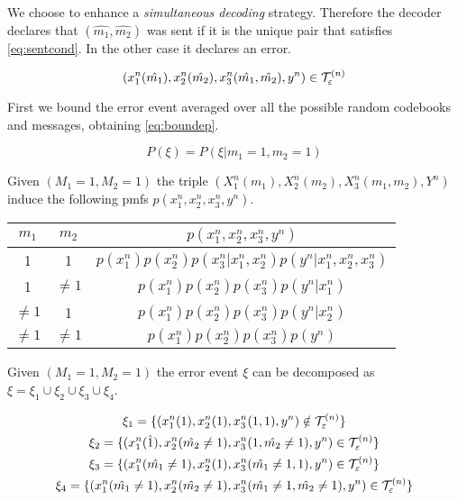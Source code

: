 We choose to enhance a \textit{simultaneous decoding} strategy. Therefore the decoder declares that $(\hat{m_1},\hat{m_2})$ was sent if it is the unique pair that satisfies \eqref{eq:sentcond}. In the other case it declares an error.

\begin{equation}
	(x_1^n(\hat{m_1}),x_2^n(\hat{m_2}), x_3^n(\hat{m_1}, \hat{m_2}), y^n) \in \mathcal{T}_\varepsilon^{(n)}{}
	\label{eq:sentcond}
\end{equation}

First we bound the error event averaged over all the possible random codebooks and messages, obtaining \eqref{eq:boundep}.

\begin{equation}
	P(\xi)=P(\xi | m_1=1,m_2=1)
	\label{eq:boundep}
\end{equation}

Given $(M_1=1,M_2=1)$ the triple $(X_1^n(m_1),X_2^n(m_2), X_3^n(m_1,m_2),Y^n)$ induce the following pmfs $p(x_1^n,x_2^n,x_3^n,y^n)$.

\begin{center}
    \begin{tabular}{ | c | c | c |}
    \hline
		$m_1$ & $m_2$ & $p(x_1^n,x_2^n,x_3^n,y^n)$ \\ \hline
		1 & 1 & $p(x_1^n)p(x_2^n)p(x_3^n|x_1^n,x_2^n)p(y^n|x_1^n,x_2^n,x_3^n)$ \\ \hline
    1 & $\neq 1$ & $p(x_1^n)p(x_2^n)p(x_3^n)p(y^n|x_1^n)$ \\ \hline
    $\neq 1$ & 1 & $p(x_1^n)p(x_2^n)p(x_3^n)p(y^n|x_2^n)$ \\ \hline
		$\neq 1$ & $\neq 1$ & $p(x_1^n)p(x_2^n)p(x_3^n)p(y^n)$ \\ \hline
    \end{tabular}
\end{center}

Given $(M_1=1,M_2=1)$ the error event $\xi$ can be decomposed as $\xi = \xi_1 \cup \xi_2 \cup \xi_3 \cup \xi_4$.

\begin{equation}
	\begin{gathered}
		\xi_1 = \{ (x_1^n(1),x_2^n(1), x_3^n(1,1), y^n) \notin \mathcal{T}_\varepsilon^{(n)}{} \} \\
		\xi_2 = \{ (x_1^n(\hat{1}),x_2^n(\hat{m_2} \neq 1), x_3^n(1,\hat{m_2} \neq 1), y^n) \in \mathcal{T}_\varepsilon^{(n)}{} \} \\
		\xi_3 = \{ (x_1^n(\hat{m_1}\neq 1),x_2^n(1), x_3^n(\hat{m_1} \neq 1,1), y^n) \in \mathcal{T}_\varepsilon^{(n)}{} \} \\
		\xi_4 = \{ (x_1^n(\hat{m_1}\neq 1),x_2^n(\hat{m_2} \neq 1), x_3^n(\hat{m_1} \neq 1,\hat{m_2} \neq 1), y^n) \in \mathcal{T}_\varepsilon^{(n)}{} \} \\
	\end{gathered}
\end{equation}

